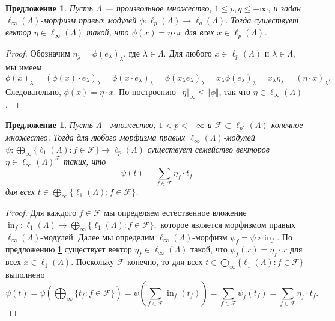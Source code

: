 \documentclass[12pt]{article}
\newtheorem{proposition}[theorem]{Предложение}
\begin{document}
\begin{proposition}\label{LinfnMorphlpntolqnCharac}
    Пусть $\Lambda$ --- произвольное множество, $1\leq p,q\leq +\infty$, 
    и задан $\ell_\infty(\Lambda)$-морфизм правых модулей 
    $\phi:\ell_p(\Lambda)\to \ell_{q}(\Lambda)$. Тогда существует 
    вектор $\eta\in\ell_\infty(\Lambda)$ такой, что $\phi(x)=\eta\cdot x$ 
    для всех $x\in \ell_p(\Lambda)$.
\end{proposition}
\begin{proof}
    Обозначим $\eta_\lambda=\phi(e_\lambda)_\lambda$, где $\lambda\in\Lambda$. 
    Для любого $x\in\ell_p(\Lambda)$ и $\lambda\in\Lambda$, мы имеем
    \[
        \phi(x)_\lambda
        =(\phi(x)\cdot e_\lambda)_\lambda
        =\phi(x\cdot e_\lambda)_\lambda
        =\phi(x_\lambda e_\lambda)_\lambda
        =x_\lambda\phi(e_\lambda)_\lambda
        =x_\lambda\eta_\lambda
        =(\eta\cdot x)_\lambda.
    \]
    Следовательно, $\phi(x)=\eta\cdot x$. По 
    построению $\Vert\eta\Vert_\infty\leq\Vert\phi\Vert$, 
    так что $\eta\in\ell_\infty(\Lambda)$.
\end{proof}

\begin{proposition}\label{ExtMorphSuml1ntlpnCharac}
    Пусть $\Lambda$ - множество, $1<p<+\infty$ 
    и $\mathcal{F}\subset \ell_{p^*}(\Lambda)$ конечное множество. Тогда для любого 
    морфизма правых $\ell_\infty(\Lambda)$-модулей
    $\psi:\bigoplus_\infty\{\ell_1(\Lambda):f\in\mathcal{F}\}\to\ell_p(\Lambda)$ 
    существует семейство векторов $\eta\in\ell_\infty(\Lambda)^\mathcal{F}$ 
    таких, что
    \[
        \psi(t)=\sum_{f\in\mathcal{F}} \eta_f \cdot t_f
    \]
    для всех $t\in \bigoplus_\infty\{ \ell_1(\Lambda):f\in\mathcal{F}\}$.
\end{proposition}
\begin{proof}
    Для каждого $f\in\mathcal{F}$ мы определяем естественное вложение
    $
        \operatorname{in}_f:
        \ell_1(\Lambda)\to\bigoplus_\infty\{\ell_1(\Lambda):f\in\mathcal{F}\},
    $
    которое является морфизмом правых $\ell_\infty(\Lambda)$-модулей. Далее мы 
    определим $\ell_\infty(\Lambda)$-морфизм 
    $\psi_f=\psi\circ \operatorname{in}_f$. 
    По предложению \ref{LinfnMorphlpntolqnCharac} существует 
    вектор $\eta_f\in\ell_\infty(\Lambda)$ такой, что $\psi_f(x)=\eta_f\cdot x$ 
    для всех $x\in\ell_1(\Lambda)$. Поскольку $\mathcal{F}$ конечно, то для 
    всех $t\in \bigoplus_\infty\{ \ell_1(\Lambda) : f\in \mathcal{F}\}$ 
    выполнено
    \[
        \psi(t)
        =\psi\left(\bigoplus_\infty\{ t_f : f\in\mathcal{F}\}\right)
        =\psi\left(\sum_{f\in\mathcal{F}} \operatorname{in}_f(t_f)\right)
        =\sum_{f\in\mathcal{F}}\psi_f(t_f)
        =\sum_{f\in\mathcal{F}} \eta_f\cdot t_f.
    \]
\end{proof}
\end{document}
